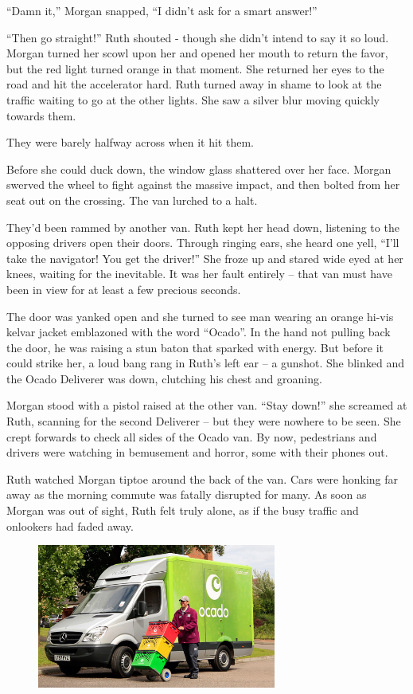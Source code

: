 “Damn it,” Morgan snapped, “I didn’t ask for a smart answer!”

“Then go straight!” Ruth shouted - though she didn’t intend to say it so loud. Morgan turned her scowl upon her and opened her mouth to return the favor, but the red light turned orange in that moment. She returned her eyes to the road and hit the accelerator hard. Ruth turned away in shame to look at the traffic waiting to go at the other lights. She saw a silver blur moving quickly towards them.  

They were barely halfway across when it hit them. 

Before she could duck down, the window glass shattered over her face. Morgan swerved the wheel to fight against the massive impact, and then bolted from her seat out on the crossing. The van lurched to a halt.

They’d been rammed by another van. Ruth kept her head down, listening to the opposing drivers open their doors. Through ringing ears, she heard one yell, “I’ll take the navigator! You get the driver!” She froze up and stared wide eyed at her knees, waiting for the inevitable. It was her fault entirely – that van must have been in view for at least a few precious seconds. 

The door was yanked open and she turned to see man wearing an orange hi-vis kelvar jacket emblazoned with the word “Ocado”. In the hand not pulling back the door, he was raising a stun baton that sparked with energy. But before it could strike her, a loud bang rang in Ruth’s left ear – a gunshot. She blinked and the Ocado Deliverer was down, clutching his chest and groaning. 

Morgan stood with a pistol raised at the other van. “Stay down!” she screamed at Ruth, scanning for the second Deliverer – but they were nowhere to be seen. She crept forwards to check all sides of the Ocado van. By now, pedestrians and drivers were watching in bemusement and horror, some with their phones out. 

Ruth watched Morgan tiptoe around the back of the van. Cars were honking far away as the morning commute was fatally disrupted for many. As soon as Morgan was out of sight, Ruth felt truly alone, as if the busy traffic and onlookers had faded away.  

\begin{figure}[h!]
\centering
\includegraphics[width=0.7\textwidth]{./pictures/ocado}
\end{figure}

